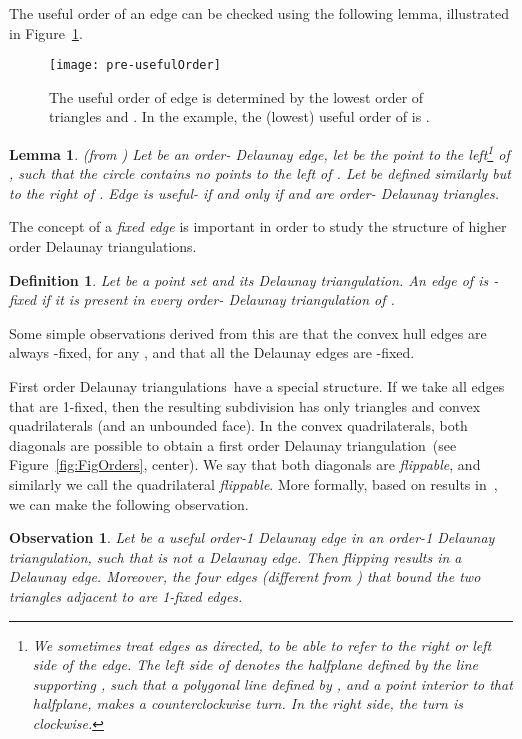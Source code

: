 \documentclass {journal}
\newtheorem {lemma} {Lemma}
\newtheorem {observation} {Observation}
\newtheorem {definition} {Definition}
\newcommand {\hodts}{higher order Delaunay triangulations}
\newcommand {\fodt}{first order Delaunay triangulation}
\newcommand {\Fodts}{First order Delaunay triangulations}
\begin{document}
The useful order of an edge can be checked using the following lemma, illustrated in Figure~\ref{fig:pre-usefulOrder}.


\begin{figure}[tb]
\centering
\texttt{[image: pre-usefulOrder]}
\caption{The useful order of edge  is determined by
the lowest order of triangles  and . In the example, the (lowest) useful order of
 is .} \label{fig:pre-usefulOrder}
\end{figure}

\begin{lemma}
  \label {lem:useful_edge_test}
      (from \cite{ghk-hodt-02}) Let  be an order- Delaunay edge, let  be the point to the left\footnote{
      We sometimes treat edges as directed, to be able to refer to the right or left side of the edge.
      The \emph{left} side of  denotes the halfplane defined by the line
      supporting , such that
       a polygonal line defined by ,  and a point interior to that halfplane, makes a counterclockwise turn.
       In the \emph{right} side, the turn is clockwise.}
       of , such that the circle  contains no points to the left of .
       Let  be defined similarly but to the right of . Edge  is
       useful- if and only if  and  are order- Delaunay triangles.
\end{lemma}

The concept of a \emph{fixed edge} is important in order to study
the structure of \hodts.

\begin{definition}
Let  be a point set and  its Delaunay triangulation. An
edge of  is \emph{-fixed} if it is present in every
order- Delaunay triangulation of .
\end{definition}

Some simple observations derived from this are that the convex hull edges are always -fixed, for any , and that all the Delaunay edges are -fixed.


\Fodts\ have a special structure.
  If we take all edges that are 1-fixed, then the resulting subdivision has only triangles and
  convex quadrilaterals (and an unbounded face). In the convex quadrilaterals,
  both diagonals are possible to obtain a \fodt\ (see Figure~\ref{fig:FigOrders}, center).
  We say that both diagonals are \emph{flippable}, and similarly we call the quadrilateral \emph{flippable}.
More formally, based on results in~\cite{ghk-hodt-02}, we can make the following observation.

\begin{observation}
\label{obs:Order1Edge}
Let  be a useful order-1 Delaunay edge in an order-1 Delaunay triangulation, such that  is not a Delaunay edge.
Then flipping  results in a Delaunay edge. Moreover, the four edges (different from ) that bound the two triangles adjacent to  are 1-fixed edges.
\end{observation}
\end{document}
